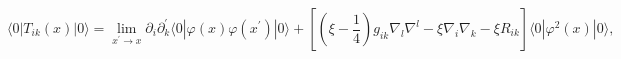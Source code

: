\begin{equation}
\langle 0|T_{ik}(x)|0\rangle =\lim_{x^{\prime }\rightarrow
x}\partial _{i}\partial _{k}^{\prime }\langle 0|\varphi (x)\varphi
(x^{\prime })|0\rangle +\left[ \left( \xi -\frac{1}{4}\right)
g_{ik}\nabla _{l}\nabla ^{l}-\xi \nabla _{i}\nabla _{k}-\xi
R_{ik}\right] \langle 0|\varphi ^{2}(x)|0\rangle ,
\label{mvevEMT}
\end{equation}

